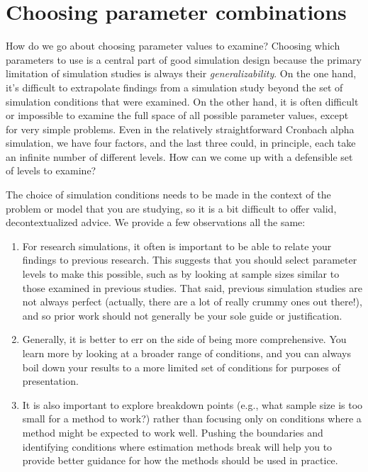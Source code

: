 \documentclass[
]{book}
\begin{document}
\section{Choosing parameter combinations}\label{choosing-parameter-combinations}

How do we go about choosing parameter values to examine?
Choosing which parameters to use is a central part of good simulation design because the primary limitation of simulation studies is always their \emph{generalizability}.
On the one hand, it's difficult to extrapolate findings from a simulation study beyond the set of simulation conditions that were examined. On the other hand, it is often difficult or impossible to examine the full space of all possible parameter values, except for very simple problems.
Even in the relatively straightforward Cronbach alpha simulation, we have four factors, and the last three could, in principle, each take an infinite number of different levels.
How can we come up with a defensible set of levels to examine?

The choice of simulation conditions needs to be made in the context of the problem or model that you are studying, so it is a bit difficult to offer valid, decontextualized advice.
We provide a few observations all the same:

\begin{enumerate}
\def\labelenumi{\arabic{enumi}.}
\item
  For research simulations, it often is important to be able to relate your findings to previous research. This suggests that you should select parameter levels to make this possible, such as by looking at sample sizes similar to those examined in previous studies. That said, previous simulation studies are not always perfect (actually, there are a lot of really crummy ones out there!), and so prior work should not generally be your sole guide or justification.
\item
  Generally, it is better to err on the side of being more comprehensive. You learn more by looking at a broader range of conditions, and you can always boil down your results to a more limited set of conditions for purposes of presentation.
\item
  It is also important to explore breakdown points (e.g., what sample size is too small for a method to work?) rather than focusing only on conditions where a method might be expected to work well. Pushing the boundaries and identifying conditions where estimation methods break will help you to provide better guidance for how the methods should be used in practice.
\end{enumerate}
\end{document}
